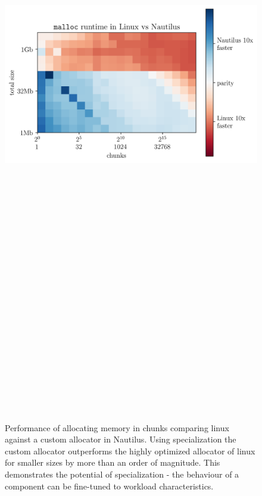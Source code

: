 \documentclass[final]{beamer}
\newlength{\onecolwid}
\begin{document}
\begin{frame}[t]
\begin{columns}[t]
\begin{column}{\onecolwid}
\begin{figure}
        \includegraphics[height=30cm]{plots/malloc.png}
        \label{fig:1}
        \caption{Performance of allocating memory in chunks comparing linux against a custom  allocator in Nautilus. Using specialization the custom allocator outperforms the highly optimized allocator of linux for smaller sizes by more than an order of magnitude. This demonstrates the potential of specialization - the behaviour of a component can be fine-tuned to workload characteristics.}
      \end{figure}
      
%      
      
    \end{column}


\end{columns}
\end{frame}
\end{document}
